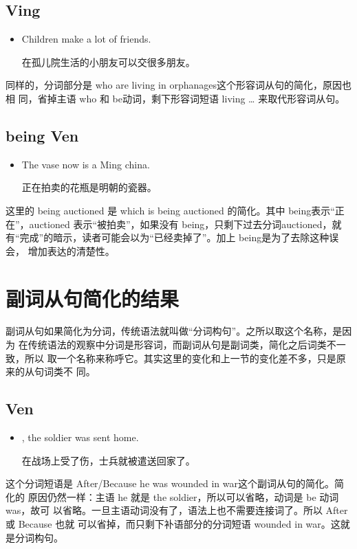 \subsection{Ving}

\begin{itemize}
\item  Children  make a lot of friends.

  在孤儿院生活的小朋友可以交很多朋友。
\end{itemize}
同样的，分词部分是 who are living in orphanages这个形容词从句的简化，原因也相
同，省掉主语 who 和 be动词，剩下形容词短语 living \ldots{} 来取代形容词从句。

\subsection{being Ven}

\begin{itemize}
\item  The vase  now is a Ming china.

  正在拍卖的花瓶是明朝的瓷器。
\end{itemize}
这里的 being auctioned 是 which is being auctioned 的简化。其中 being表示“正
在”，auctioned 表示“被拍卖”，如果没有 being，只剩下过去分词auctioned，就
有“完成”的暗示，读者可能会以为“已经卖掉了”。加上 being是为了去除这种误会，
增加表达的清楚性。

\section{副词从句简化的结果}

副词从句如果简化为分词，传统语法就叫做“分词构句”。之所以取这个名称，是因为
在传统语法的观察中分词是形容词，而副词从句是副词类，简化之后词类不一致，所以
取一个名称来称呼它。其实这里的变化和上一节的变化差不多，只是原来的从句词类不
同。

\subsection{Ven}

\begin{itemize}
\item  {}, the soldier was sent home.

在战场上受了伤，士兵就被遣送回家了。
\end{itemize}
这个分词短语是 After/Because he was wounded in war这个副词从句的简化。简化的
原因仍然一样：主语 he 就是 the soldier，所以可以省略，动词是 be 动词was，故可
以省略。一旦主语动词没有了，语法上也不需要连接词了。所以 After或 Because 也就
可以省掉，而只剩下补语部分的分词短语 wounded in war。这就是分词构句。


